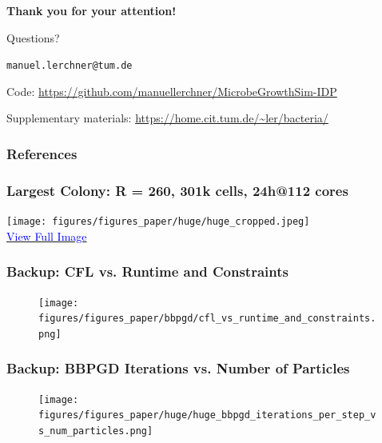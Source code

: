 \documentclass[10pt,t]{beamer}
\begin{document}
\begin{frame}
    \begin{center}
        \vspace{1cm}
        {\LARGE \textbf{Thank you for your attention!}}

        \vspace{1.5cm}

        \Huge{Questions?}

        \vspace{.8cm}

        \small
        \texttt{manuel.lerchner@tum.de}

        \vspace{0.3cm}
        Code: \url{https://github.com/manuellerchner/MicrobeGrowthSim-IDP}

        \vspace{0.2cm}
        Supplementary materials: \url{https://home.cit.tum.de/~ler/bacteria/}
    \end{center}
\end{frame}

\begin{frame}
    \frametitle{References}
    \scriptsize
    
    
\end{frame}

\appendix

\begin{frame}
    \frametitle{Largest Colony: R = 260, 301k cells, 24h@112 cores}
    \begin{center}
        {\texttt{[image: figures/figures\_paper/huge/huge\_cropped.jpeg]}}\\[0.6em]
        \small
        \href{https://home.cit.tum.de/~ler/bacteria/videos/huge_high_quality.jpeg}{\textcolor{blue}{{View Full Image}}}
    \end{center}
\end{frame}

\begin{frame}
    \frametitle{Backup: CFL vs. Runtime and Constraints}

    \begin{figure}
        \centering
        \texttt{[image: figures/figures\_paper/bbpgd/cfl\_vs\_runtime\_and\_constraints.png]}
    \end{figure}
\end{frame}

\begin{frame}
    \frametitle{Backup: BBPGD Iterations vs. Number of Particles}

    \begin{figure}
        \centering
        \texttt{[image: figures/figures\_paper/huge/huge\_bbpgd\_iterations\_per\_step\_vs\_num\_particles.png]}
    \end{figure}
\end{frame}
\end{document}
